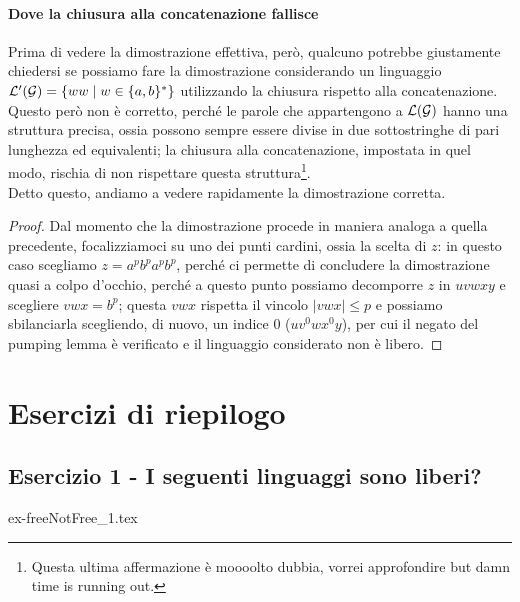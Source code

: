 \documentclass[class=book, crop=false, oneside, 12pt]{standalone}
\begin{document}
  \paragraph{Dove la chiusura alla concatenazione fallisce}
  Prima di vedere la dimostrazione effettiva, però, qualcuno potrebbe giustamente chiedersi se possiamo fare la dimostrazione considerando un linguaggio \(\mathcal{L}'(\mathcal{G}) = \{ww \mid w\in\{a,b\}^*\}\) utilizzando la chiusura rispetto alla concatenazione. Questo però non è corretto, perché le parole che appartengono a \(\mathcal{L}(\mathcal{G})\) hanno una struttura precisa, ossia possono sempre essere divise in due sottostringhe di pari lunghezza ed equivalenti; la chiusura alla concatenazione, impostata in quel modo, rischia di non rispettare questa struttura\footnote{Questa ultima affermazione è moooolto dubbia, vorrei approfondire but damn time is running out.}. \\
  Detto questo, andiamo a vedere rapidamente la dimostrazione corretta.
  \begin{proof}
    Dal momento che la dimostrazione procede in maniera analoga a quella precedente, focalizziamoci su uno dei punti cardini, ossia la scelta di \(z\): in questo caso scegliamo \(z=a^pb^pa^pb^p\), perché ci permette di concludere la dimostrazione quasi a colpo d'occhio, perché a questo punto possiamo decomporre \(z\) in \(uvwxy\) e scegliere \(vwx = b^p\); questa \(vwx\) rispetta il vincolo \(|vwx| \le p\) e possiamo sbilanciarla scegliendo, di nuovo, un indice 0 (\(uv^0wx^0y\)), per cui il negato del pumping lemma è verificato e il linguaggio considerato non è libero.
  \end{proof}
  
\section{Esercizi di riepilogo}
\subsection*{Esercizio 1 - I seguenti linguaggi sono liberi?}

\begin{table}[H]
	\centering
	{ex-freeNotFree_1.tex}
    \caption{Esercizio 1}
    \label{tab:ex-freeNotFree_1}
\end{table}
\end{document}
